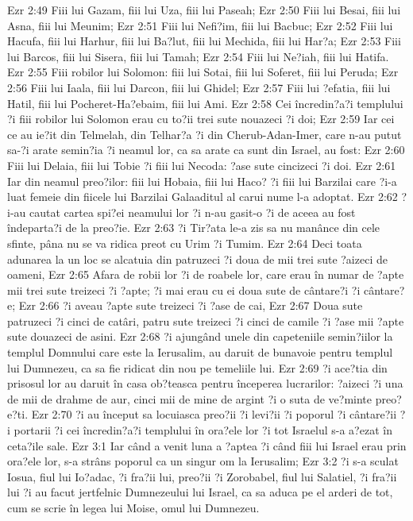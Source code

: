 Ezr 2:49  Fiii lui Gazam, fiii lui Uza, fiii lui Paseah;
Ezr 2:50  Fiii lui Besai, fiii lui Asna, fiii lui Meunim;
Ezr 2:51  Fiii lui Nefi?im, fiii lui Bacbuc;
Ezr 2:52  Fiii lui Hacufa, fiii lui Harhur, fiii lui Ba?lut, fiii lui Mechida, fiii lui Har?a;
Ezr 2:53  Fiii lui Barcos, fiii lui Sisera, fiii lui Tamah;
Ezr 2:54  Fiii lui Ne?iah, fiii lui Hatifa.
Ezr 2:55  Fiii robilor lui Solomon: fiii lui Sotai, fiii lui Soferet, fiii lui Peruda;
Ezr 2:56  Fiii lui Iaala, fiii lui Darcon, fiii lui Ghidel;
Ezr 2:57  Fiii lui ?efatia, fiii lui Hatil, fiii lui Pocheret-Ha?ebaim, fiii lui Ami.
Ezr 2:58  Cei încredin?a?i templului ?i fiii robilor lui Solomon erau cu to?ii trei sute nouazeci ?i doi;
Ezr 2:59  Iar cei ce au ie?it din Telmelah, din Telhar?a ?i din Cherub-Adan-Imer, care n-au putut sa-?i arate semin?ia ?i neamul lor, ca sa arate ca sunt din Israel, au fost:
Ezr 2:60  Fiii lui Delaia, fiii lui Tobie ?i fiii lui Necoda: ?ase sute cincizeci ?i doi.
Ezr 2:61  Iar din neamul preo?ilor: fiii lui Hobaia, fiii lui Haco? ?i fiii lui Barzilai care ?i-a luat femeie din fiicele lui Barzilai Galaaditul al carui nume l-a adoptat.
Ezr 2:62  ?i-au cautat cartea spi?ei neamului lor ?i n-au gasit-o ?i de aceea au fost îndeparta?i de la preo?ie.
Ezr 2:63  ?i Tir?ata le-a zis sa nu manânce din cele sfinte, pâna nu se va ridica preot cu Urim ?i Tumim.
Ezr 2:64  Deci toata adunarea la un loc se alcatuia din patruzeci ?i doua de mii trei sute ?aizeci de oameni,
Ezr 2:65  Afara de robii lor ?i de roabele lor, care erau în numar de ?apte mii trei sute treizeci ?i ?apte; ?i mai erau cu ei doua sute de cântare?i ?i cântare?e;
Ezr 2:66  ?i aveau ?apte sute treizeci ?i ?ase de cai,
Ezr 2:67  Doua sute patruzeci ?i cinci de catâri, patru sute treizeci ?i cinci de camile ?i ?ase mii ?apte sute douazeci de asini.
Ezr 2:68  ?i ajungând unele din capeteniile semin?iilor la templul Domnului care este la Ierusalim, au daruit de bunavoie pentru templul lui Dumnezeu, ca sa fie ridicat din nou pe temeliile lui.
Ezr 2:69  ?i ace?tia din prisosul lor au daruit în casa ob?teasca pentru începerea lucrarilor: ?aizeci ?i una de mii de drahme de aur, cinci mii de mine de argint ?i o suta de ve?minte preo?e?ti.
Ezr 2:70  ?i au început sa locuiasca preo?ii ?i levi?ii ?i poporul ?i cântare?ii ?i portarii ?i cei încredin?a?i templului în ora?ele lor ?i tot Israelul s-a a?ezat în ceta?ile sale.
Ezr 3:1  Iar când a venit luna a ?aptea ?i când fiii lui Israel erau prin ora?ele lor, s-a strâns poporul ca un singur om la Ierusalim;
Ezr 3:2  ?i s-a sculat Iosua, fiul lui Io?adac, ?i fra?ii lui, preo?ii ?i Zorobabel, fiul lui Salatiel, ?i fra?ii lui ?i au facut jertfelnic Dumnezeului lui Israel, ca sa aduca pe el arderi de tot, cum se scrie în legea lui Moise, omul lui Dumnezeu.
